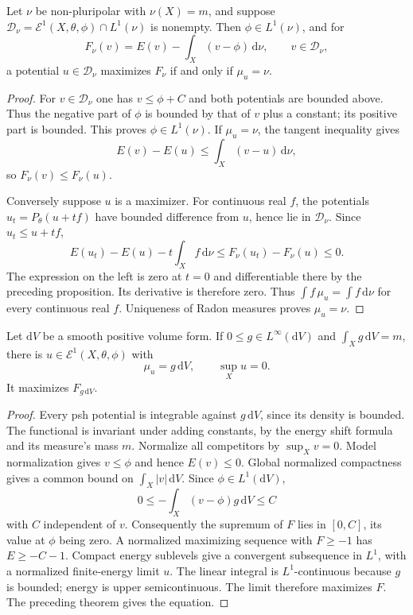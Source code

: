 \begin{theorem}\label{thm:relative-variational-characterization}
Let $\nu$ be non-pluripolar with $\nu(X)=m$, and suppose
$\mathcal D_\nu=\mathcal E^1(X,\theta,\phi)\cap L^1(\nu)$ is nonempty. Then $\phi\in L^1(\nu)$, and for
\[
 F_\nu(v)=E(v)-\int_X(v-\phi)\,\mathrm d\nu,
                       \qquad v\in\mathcal D_\nu,
\]
a potential $u\in\mathcal D_\nu$ maximizes $F_\nu$ if and only if $\mu_u=\nu$.
\end{theorem}
\begin{proof}
For $v\in\mathcal D_\nu$ one has $v\leq\phi+C$ and both potentials are bounded above. Thus the negative part of $\phi$ is bounded by that of $v$ plus a constant; its positive part is bounded. This proves $\phi\in L^1(\nu)$. If $\mu_u=\nu$, the tangent inequality gives
\[
 E(v)-E(u)\leq\int_X(v-u)\,\mathrm d\nu,
\]
so $F_\nu(v)\leq F_\nu(u)$.

Conversely suppose $u$ is a maximizer. For continuous real $f$, the potentials $u_t=P_\theta(u+tf)$ have bounded difference from $u$, hence lie in $\mathcal D_\nu$. Since $u_t\leq u+tf$,
\[
 E(u_t)-E(u)-t\int_Xf\,\mathrm d\nu
       \leq F_\nu(u_t)-F_\nu(u)\leq0.
\]
The expression on the left is zero at $t=0$ and differentiable there by the preceding proposition. Its derivative is therefore zero. Thus $\int f\,\mu_u=\int f\,\mathrm d\nu$ for every continuous real $f$. Uniqueness of Radon measures proves $\mu_u=\nu$.
\end{proof}

\begin{theorem}\label{thm:bounded-density-relative-prescribed-measure}
Let $\mathrm dV$ be a smooth positive volume form. If $0\leq g\in L^\infty(\mathrm dV)$ and $\int_Xg\,\mathrm dV=m$, there is
$u\in\mathcal E^1(X,\theta,\phi)$ with
\[
 \mu_u=g\,\mathrm dV,\qquad \sup_Xu=0.
\]
It maximizes $F_{g\,\mathrm dV}$.
\end{theorem}
\begin{proof}
Every psh potential is integrable against $g\,\mathrm dV$, since its density is bounded. The functional is invariant under adding constants, by the energy shift formula and its measure's mass $m$. Normalize all competitors by $\sup_Xv=0$. Model normalization gives $v\leq\phi$ and hence $E(v)\leq0$. Global normalized compactness gives a common bound on $\int_X|v|\,\mathrm dV$. Since $\phi\in L^1(\mathrm dV)$,
\[
 0\leq-\int_X(v-\phi)g\,\mathrm dV\leq C
\]
with $C$ independent of $v$. Consequently the supremum of $F$ lies in $[0,C]$, its value at $\phi$ being zero. A normalized maximizing sequence with $F\geq-1$ has $E\geq-C-1$. Compact energy sublevels give a convergent subsequence in $L^1$, with a normalized finite-energy limit $u$. The linear integral is $L^1$-continuous because $g$ is bounded; energy is upper semicontinuous. The limit therefore maximizes $F$. The preceding theorem gives the equation.
\end{proof}

